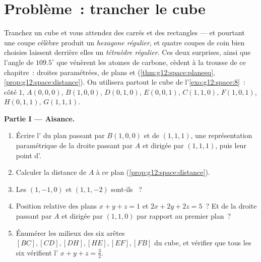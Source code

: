 \section{Problème~: trancher le cube}

\begin{problem}
\label{pb:g12:space:1}
Tranchez un cube et vous attendez des carrés et des rectangles ---
et pourtant une coupe célèbre produit un \emph{hexagone régulier}, et
quatre coupes de coin bien choisies laissent derrière elles un
\emph{tétraèdre régulier}. Ces deux surprises, ainsi que l'angle de
$109.5^\circ$ que vénèrent les atomes de carbone, cèdent à la
trousse de ce chapitre~: droites paramétrées,  de plans et
 (\cref{thm:g12:space:planeeq},
\cref{prop:g12:space:distance}). On utilisera partout le cube de
l'\cref{exo:g12:space:8}~: côté $1$, $A(0,0,0)$, $B(1,0,0)$,
$D(0,1,0)$, $E(0,0,1)$, $C(1,1,0)$, $F(1,0,1)$, $H(0,1,1)$,
$G(1,1,1)$.

\medskip
\noindent\textbf{Partie I --- Aisance.}
\begin{enumerate}
  \item Écrire l' du plan passant par $B(1,0,0)$ et de
         $(1,1,1)$, une représentation paramétrique de
        la droite passant par $A$ et dirigée par $(1,1,1)$, puis
        leur point d'.
  \item Calculer la distance de $A$ à ce plan
        (\cref{prop:g12:space:distance}).
  \item Les  $(1,-1,0)$ et $(1,1,-2)$ sont-ils
        ~?
  \item Position relative des plans $x + y + z = 1$ et
        $2x + 2y + 2z = 5$~? Et de la droite passant par $A$ et
        dirigée par $(1,1,0)$ par rapport au premier plan~?
  \item Énumérer les milieux des six arêtes
        $[BC], [CD], [DH], [HE], [EF], [FB]$ du cube, et vérifier
        que tous les six vérifient l'
        $x + y + z = \frac32$.
\end{enumerate}


\end{problem}
